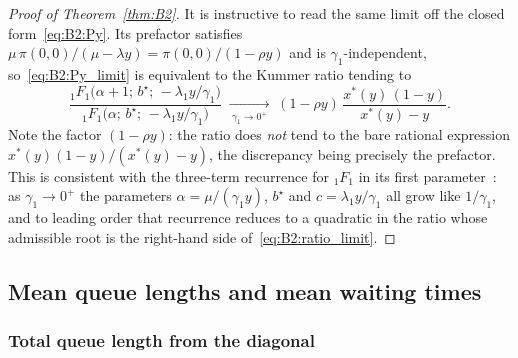 \begin{proof}[Proof of Theorem~\ref{thm:B2}]
It is instructive to read the same limit off the closed form~\eqref{eq:B2:Py}. Its prefactor
satisfies $\mu\,\pi(0,0)/(\mu-\lambda y)=\pi(0,0)/(1-\rho y)$ and is $\gamma_1$-independent,
so~\eqref{eq:B2:Py_limit} is equivalent to the Kummer ratio tending to
\begin{equation}
    \frac{{}_1F_1\!\bigl(\alpha+1;\,b^\star;\,-\lambda_1 y/\gamma_1\bigr)}
         {{}_1F_1\!\bigl(\alpha;\,b^\star;\,-\lambda_1 y/\gamma_1\bigr)}
    \;\xrightarrow[\ \gamma_1\to0^{+}\ ]{}\;
    (1-\rho y)\,\frac{x^*(y)\,(1-y)}{x^*(y)-y}.
    \label{eq:B2:ratio_limit}
\end{equation}
Note the factor $(1-\rho y)$: the ratio does \emph{not} tend to the bare rational expression
$x^*(y)(1-y)/(x^*(y)-y)$, the discrepancy being precisely the prefactor. This is consistent
with the three-term recurrence for ${}_1F_1$ in its first parameter~\cite[\S13.3]{dlmf}: as
$\gamma_1\to0^{+}$ the parameters $\alpha=\mu/(\gamma_1 y)$, $b^\star$ and
$c=\lambda_1 y/\gamma_1$ all grow like $1/\gamma_1$, and to leading order that recurrence
reduces to a quadratic in the ratio whose admissible root is the right-hand side
of~\eqref{eq:B2:ratio_limit}.
\end{proof}

\subsection{Mean queue lengths and mean waiting times}

\subsubsection*{Total queue length from the diagonal}

